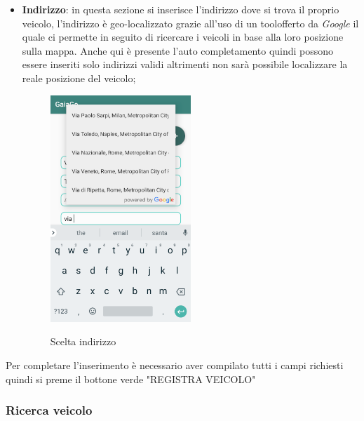 \begin{itemize}
\item \textbf{Indirizzo}: in questa sezione si inserisce l'indirizzo dove si trova il proprio veicolo, l'indirizzo è geo-localizzato grazie all'uso di un tool\glosp offerto da \textit{Google} il quale ci permette in seguito di ricercare i veicoli in base alla loro posizione sulla mappa. Anche qui è presente l'auto completamento quindi possono essere inseriti solo indirizzi validi altrimenti non sarà possibile localizzare la reale posizione del veicolo;
 \begin{figure}[H] 
	\centering 
	\includegraphics[width=0.5\textwidth]{res/images/indirizzo_auto.png}\\
	\caption{Scelta indirizzo}
	\label{indirizzo}
\end{figure}
\end{itemize}
Per completare l'inserimento è necessario aver compilato tutti i campi richiesti quindi si preme il bottone verde "REGISTRA VEICOLO"
\pagebreak

\subsubsection{Ricerca veicolo}
\label{sec:hello}

